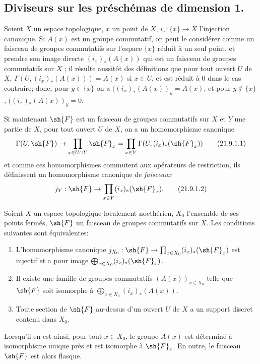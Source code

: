 \subsection{Diviseurs sur les préschémas de dimension 1.}
\label{IV.21.9}

\begin{env}[21.9.1]
\label{IV.21.9.1}
Soient $X$ un espace topologique, $x$ un point de $X$, $i_x:\{x\}\to X$ l'injection canonique.
Si $A(x)$ est un groupe commutatif, on peut le considérer comme un faisceau de groupes commutatifs sur l'espace $\{x\}$ réduit à un seul point, et prendre son image directe $(i_x)_*(A(x))$ qui est un faisceau de groupes commutatifs sur $X$ ;
il résulte aussitôt des définitions que pour tout ouvert $U$ de $X$, $\Gamma(U,(i_x)_*(A(x)))=A(x)$ si $x\in U$, et est réduit à $0$ dans le cas contraire;
donc, pour $y\in\overline{\{x\}}$ on a $((i_x)_*(A(x))_y=A(x)$, et pour $y\notin\overline{\{x\}}$, $((i_x)_*(A(x))_y=0$.

Si maintenant $\sh{F}$ est un faisceau de groupes commutatifs sur $X$ et $Y$ une partie de $X$, pour tout ouvert $U$ de $X$, on a un homomorphisme canonique
\[
\label{IV.21.9.1.1}
  \Gamma(U,\sh{F})\to\prod_{x\in U\cap Y}\sh{F}_x
  =\prod_{x\in Y}\Gamma(U,(i_x)_*(\sh{F}_x))
  \tag{21.9.1.1}
\]
et comme ces homomorphismes commutent aux opérateurs de restriction, ils définissent un homomorphisme canonique de \emph{faisceaux}
\[
\label{IV.21.9.1.2}
  j_Y:\sh{F}\to\prod_{x\in Y}(i_x)_*(\sh{F}_x).
  \tag{21.9.1.2}
\]
\end{env}

\begin{lemma}[21.9.2]
\label{IV.21.9.2}
Soient $X$ un espace topologique localement noethérien, $X_0$ l'ensemble de ses points fermés, $\sh{F}$ un faisceau de groupes commutatifs sur $X$.
Les conditions suivantes sont équivalentes:
\begin{enumerate}[label=\emph{\alph*)}]
  \item L'homomorphisme canonique $j_{X_0}:\sh{F}\to\prod_{x\in X_0}(i_x)_*(\sh{F}_x)$ est injectif et a pour image $\bigoplus_{x\in X_0}(i_x)_*(\sh{F}_x)$.
  \item[\rm a$'$)] Il existe une famille de groupes commutatifs $(A(x))_{x\in X_0}$ telle que $\sh{F}$ soit isomorphe à $\bigoplus_{x\in X_0}(i_x)_*(A(x))$.
  \item Toute section de $\sh{F}$ au-dessus d'un ouvert $U$ de $X$ a un support discret contenu dans $X_0$.
\end{enumerate}

Lorsqu'il en est ainsi, pour tout $x\in X_0$, le groupe $A(x)$ est déterminé à isomorphisme unique près et est isomorphe à $\sh{F}_x$.
En outre, le faisceau $\sh{F}$ est alors flasque.
\end{lemma}

